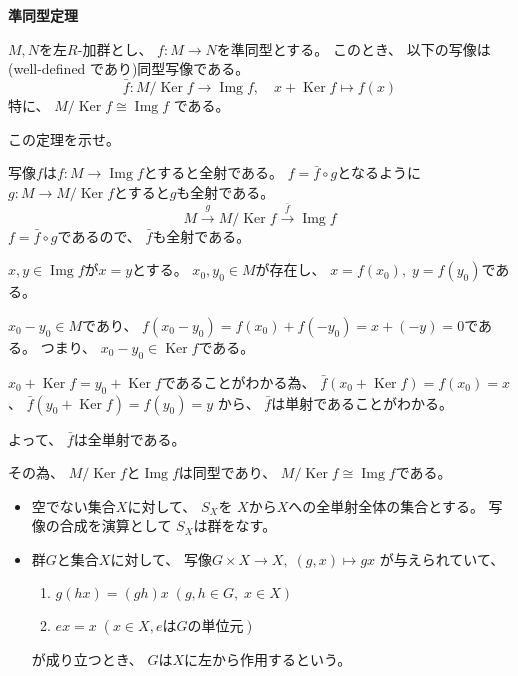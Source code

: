 \documentclass[12pt,b5paper]{ltjsarticle}
\newcommand{\Ker}{\mathop{\mathrm{Ker}}\nolimits}
\newcommand{\Img}{\mathop{\mathrm{Img}}\nolimits}
\begin{document}
\hrulefill

\textbf{準同型定理}

$M,N$を左$R$-加群とし、
$f:M\to N$を準同型とする。
このとき、
以下の写像は (well-defined であり)同型写像である。
\begin{equation}
 \bar{f} : M/ \Ker{f} \to \Img{f}, \quad x+\Ker{f} \mapsto f(x)
\end{equation}
特に、
$M/\Ker{f} \cong \Img{f}$
である。


この定理を示せ。

\dotfill

写像$f$は$f:M\to\Img{f}$とすると全射である。
$f=\bar{f}\circ g$となるように
$g:M\to M/\Ker{f}$とすると$g$も全射である。
\begin{equation}
 M \overset{g}{\longrightarrow} M / \Ker{f} \overset{\bar{f}}{\longrightarrow}  \Img{f}
\end{equation}
$f=\bar{f}\circ g$であるので、
$\bar{f}$も全射である。

$x,y\in \Img{f}$が$x=y$とする。
$x_{0},y_{0}\in M$が存在し、
$x=f(x_{0}),\;y=f(y_{0})$である。

$x_{0}-y_{0}\in M$であり、
$f(x_{0}-y_{0})=f(x_{0})+f(-y_{0})=x+(-y)=0$である。
つまり、
$x_{0}-y_{0}\in \Ker{f}$である。

$x_{0} +\Ker{f} = y_{0}+\Ker{f}$であることがわかる為、
$\bar{f}(x_{0}+\Ker{f})=f(x_{0})=x$、
$\bar{f}(y_{0}+\Ker{f})=f(y_{0})=y$
から、
$\bar{f}$は単射であることがわかる。

よって、
$\bar{f}$は全単射である。

その為、
$M/\Ker{f}$と$\Img{f}$は同型であり、
$M/\Ker{f} \cong \Img{f}$である。



\hrulefill

\begin{itemize}
 \item
      空でない集合$X$に対して、
      $S_{X}$を
      $X$から$X$への全単射全体の集合とする。
      写像の合成を演算として
      $S_{X}$は群をなす。

 \item
      群$G$と集合$X$に対して、
      写像$G \times X \to X, \; (g,x) \mapsto gx$
      が与えられていて、
      \begin{enumerate}
       \item $g(hx) = (gh)x \; (g,h \in G, \; x \in X)$
       \item $ex=x \; (x\in X, e は G の単位元)$
      \end{enumerate}
      が成り立つとき、
      $G$は$X$に左から作用するという。
\end{itemize}
\end{document}
